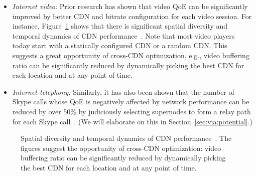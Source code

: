 \begin{itemize}

\item{\em Internet video:} 
Prior research has shown that video QoE can be significantly improved
by better CDN and bitrate configuration for
each video session.
For instance, Figure~\ref{fig:back-cross-cdn} shows that there is 
significant spatial diversity and temporal dynamics of CDN 
performance~\cite{sigcomm12}.
Note that most video players today start with a statically configured 
CDN or a random CDN. This suggests a 
great opportunity of cross-CDN optimization, e.g.,
video buffering ratio can be significantly reduced by dynamically
picking the best CDN for each location and at any point of time.

\item{\em Internet telephony:}
Similarly, it has also been shown that the number of Skype 
calls whose QoE is negatively affected by network performance
can be reduced by over 50\% by judiciously selecting supernodes
to form a relay path for each Skype call~\cite{via}.
(We will elaborate on this in Section~\ref{sec:via:potential}.)


\end{itemize}

\begin{figure}[t]
\centering
\captionsetup[subfigure]{justification=centering,farskip=-1pt,captionskip=5pt}
\caption{Spatial diversity and temporal dynamics of CDN 
performance~\cite{sigcomm12}. 
The figures suggest the opportunity of cross-CDN optimization:
video buffering ratio can be significantly reduced by dynamically
picking the best CDN for each location and at any point of time.}
\label{fig:back-cross-cdn}
\end{figure}


